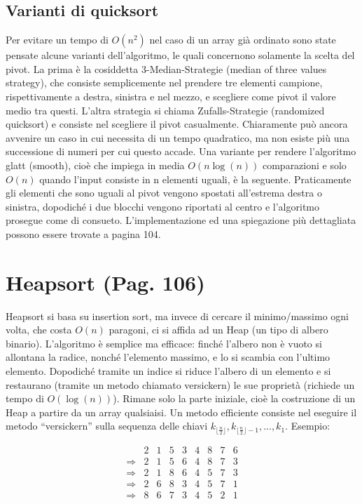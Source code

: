 \documentclass[a4paper]{book}
\begin{document}
\subsection*{Varianti di quicksort}
Per evitare un tempo di $O(n^2)$ nel caso di un array già ordinato sono state pensate alcune varianti dell'algoritmo, le quali concernono solamente la scelta del pivot. La prima è la cosiddetta 3-Median-Strategie (median of three values strategy), che consiste semplicemente nel prendere tre elementi campione, rispettivamente a destra, sinistra e nel mezzo, e scegliere come pivot il valore medio tra questi.
L'altra strategia si chiama Zufalls-Strategie (randomized quicksort) e consiste nel scegliere il pivot casualmente. Chiaramente può ancora avvenire un caso in cui necessita di un tempo quadratico, ma non esiste più una successione di numeri per cui questo accade. Una variante per rendere l'algoritmo glatt (smooth), cioè che impiega in media $O(n \log (n))$ comparazioni e  solo $O(n)$ quando l'input consiste in n elementi uguali, è la seguente. Praticamente gli elementi che sono uguali al pivot vengono spostati all'estrema destra o sinistra, dopodiché i due blocchi vengono riportati al centro e l'algoritmo prosegue come di consueto. L'implementazione ed una spiegazione più dettagliata possono essere trovate a pagina 104.

\section{Heapsort (Pag. 106)}
Heapsort si basa su insertion sort, ma invece di cercare il minimo/massimo ogni volta, che costa $O(n)$ paragoni, ci si affida ad un Heap (un tipo di albero binario). L'algoritmo è semplice ma efficace: finché l'albero non è vuoto si allontana la radice, nonché l'elemento massimo, e lo si scambia con l'ultimo elemento. Dopodiché tramite un indice si riduce l'albero di un elemento e si restaurano (tramite un metodo chiamato versickern) le sue proprietà (richiede un tempo di $O(\log (n))$). Rimane solo la parte iniziale, cioè la costruzione di un Heap a partire da un array qualsiaisi. Un metodo efficiente consiste nel eseguire il metodo ``versickern'' sulla sequenza delle chiavi $k_{\lfloor \frac{n}{2} \rfloor}, k_{\lfloor \frac{n}{2} \rfloor - 1}, ... , k_1$. Esempio:

\[\begin{array}{*{20}{c}}
{}&{2}&1&{5}&{3}&4&8&7&6\\
{\Rightarrow}&2&{1}&{5}&{6}&4&8&7&3\\
{\Rightarrow}&2&{1}&{8}&{6}&4&5&7&3\\
{\Rightarrow}&2&{6}&{8}&3&{4}&5&7&1\\
{\Rightarrow}&8&{6}&7&{3}&{4}&5&2&1\\
\end{array}\]
\end{document}
